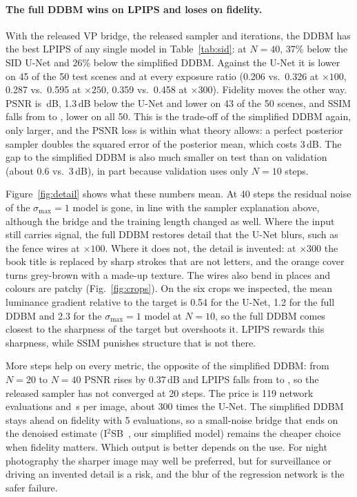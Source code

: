 \paragraph{The full DDBM wins on LPIPS and loses on fidelity.} With the released VP bridge, the released sampler and \VPITERS{} iterations, the DDBM has the best LPIPS of any single model in Table~\ref{tab:sid}: \VPFORTYLPIPS{} at $N=40$, 37\% below the SID U-Net and 26\% below the simplified DDBM. Against the U-Net it is lower on 45 of the 50 test scenes and at every exposure ratio (0.206 vs.\ 0.326 at $\times100$, 0.287 vs.\ 0.595 at $\times250$, 0.359 vs.\ 0.458 at $\times300$). Fidelity moves the other way. PSNR is \VPFORTYPSNR\,dB, 1.3\,dB below the U-Net and lower on 43 of the 50 scenes, and SSIM falls from \SIDRESSIM{} to \VPFORTYSSIM{}, lower on all 50. This is the trade-off of the simplified DDBM again, only larger, and the PSNR loss is within what theory allows: a perfect posterior sampler doubles the squared error of the posterior mean, which costs 3\,dB. The gap to the simplified DDBM is also much smaller on test than on validation (about 0.6 vs.\ 3\,dB), in part because validation uses only $N=10$ steps.

Figure~\ref{fig:detail} shows what these numbers mean. At 40 steps the residual noise of the $\sigma_{\max}=1$ model is gone, in line with the sampler explanation above, although the bridge and the training length changed as well. Where the input still carries signal, the full DDBM restores detail that the U-Net blurs, such as the fence wires at $\times100$. Where it does not, the detail is invented: at $\times300$ the book title is replaced by sharp strokes that are not letters, and the orange cover turns grey-brown with a made-up texture. The wires also bend in places and colours are patchy (Fig.~\ref{fig:crops}). On the six crops we inspected, the mean luminance gradient relative to the target is 0.54 for the U-Net, 1.2 for the full DDBM and 2.3 for the $\sigma_{\max}=1$ model at $N=10$, so the full DDBM comes closest to the sharpness of the target but overshoots it. LPIPS rewards this sharpness, while SSIM punishes structure that is not there.

More steps help on every metric, the opposite of the simplified DDBM: from $N=20$ to $N=40$ PSNR rises by 0.37\,dB and LPIPS falls from \VPTWENTYLPIPS{} to \VPFORTYLPIPS{}, so the released sampler has not converged at 20 steps. The price is 119 network evaluations and \TVPFORTY\,s per image, about 300 times the U-Net. The simplified DDBM stays ahead on fidelity with 5 evaluations, so a small-noise bridge that ends on the denoised estimate (I$^2$SB~\cite{liu2023i2sb}, our simplified model) remains the cheaper choice when fidelity matters. Which output is better depends on the use. For night photography the sharper image may well be preferred, but for surveillance or driving an invented detail is a risk, and the blur of the regression network is the safer failure.

